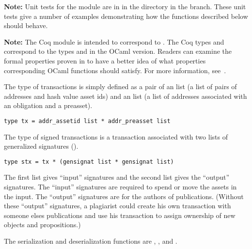 {\bf{Note:}} Unit tests for the {} module are in {}
in the {}
directory in the {} branch.
These unit tests give a number of examples demonstrating how the functions described below should behave.

{\bf{Note:}} The Coq module {} is intended to correspond to {}.
The Coq types {} and {} correspond to the types {} and {} in the OCaml version.
Readers can examine the formal properties proven in {} to have a better
idea of what properties corresponding OCaml functions should satisfy.
For more information, see~\cite{White2015b}.

The type {} of transactions is simply defined as a pair of
an {} list (a list of pairs of addresses and hash value asset ids)
and an {} list (a list of addresses associated with an obligation and a preasset).
\begin{verbatim}
type tx = addr_assetid list * addr_preasset list
\end{verbatim}

The type {} of signed transactions is a transaction associated
with two lists of generalized signatures ({}).
\begin{verbatim}
type stx = tx * (gensignat list * gensignat list)
\end{verbatim}
The first list gives ``input'' signatures and the second list gives the ``output'' signatures.
The ``input'' signatures are required to spend or move the assets in the input.
The ``output'' signatures are for the authors of publications.
(Without these ``output'' signatures, a plagiarist could create his own transaction
with someone elses publications and use his transaction to assign ownership of
new objects and propositions.)

The serialization and deserialization functions are
{},
{},
{}
and
{}.

